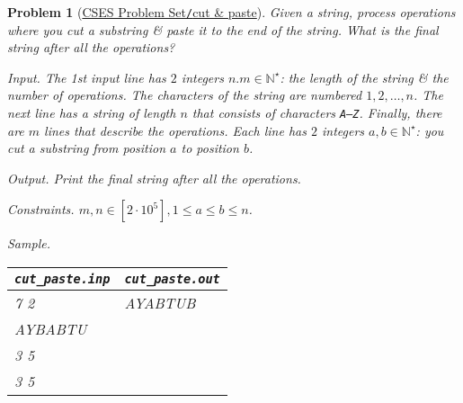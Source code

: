 \documentclass{article}
\newtheorem{problem}{Problem}
\begin{document}
\begin{problem}[\href{https://cses.fi/problemset/task/2072}{CSES Problem Set{\tt/}cut \& paste}]
    Given a string, process operations where you cut a substring \& paste it to the end of the string. What is the final string after all the operations?
    \item {\sf Input.} The 1st input line has $2$ integers $n.m\in\mathbb{N}^\star$: the length of the string \& the number of operations. The characters of the string are numbered $1,2,\ldots,n$. The next line has a string of length $n$ that consists of characters {\tt A--Z}. Finally, there are $m$ lines that describe the operations. Each line has $2$ integers $a,b\in\mathbb{N}^\star$: you cut a substring from position $a$ to position $b$.
    \item {\sf Output.} Print the final string after all the operations.
    \item {\sf Constraints.} $m,n\in[2\cdot10^5],1\le a\le b\le n$.
    \item {\sf Sample.}
    \begin{table}[H]
        \centering
        \begin{tabular}{|l|l|}
            \hline
            \verb|cut_paste.inp| & \verb|cut_paste.out| \\
            \hline
            7 2 & AYABTUB \\
            AYBABTU & \\
            3 5 & \\
            3 5 & \\
            \hline
        \end{tabular}
    \end{table}
\end{problem}
\end{document}
